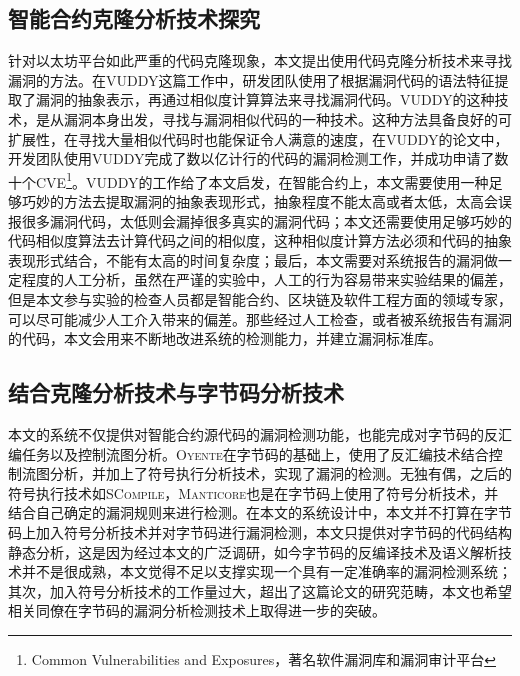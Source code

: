 \subsection{智能合约克隆分析技术探究}
针对以太坊平台如此严重的代码克隆现象，本文提出使用代码克隆分析技术来寻找漏洞的方法。在VUDDY\cite{vuddy}这篇工作中，研发团队使用了根据漏洞代码的语法特征提取了漏洞的抽象表示，再通过相似度计算算法来寻找漏洞代码。VUDDY的这种技术，是从漏洞本身出发，寻找与漏洞相似代码的一种技术。这种方法具备良好的可扩展性，在寻找大量相似代码时也能保证令人满意的速度，在VUDDY的论文中，开发团队使用VUDDY完成了数以亿计行的代码的漏洞检测工作，并成功申请了数十个CVE\footnote{Common Vulnerabilities and Exposures，著名软件漏洞库和漏洞审计平台}。VUDDY的工作给了本文启发，在智能合约上，本文需要使用一种足够巧妙的方法去提取漏洞的抽象表现形式，抽象程度不能太高或者太低，太高会误报很多漏洞代码，太低则会漏掉很多真实的漏洞代码；本文还需要使用足够巧妙的代码相似度算法去计算代码之间的相似度，这种相似度计算方法必须和代码的抽象表现形式结合，不能有太高的时间复杂度；最后，本文需要对系统报告的漏洞做一定程度的人工分析，虽然在严谨的实验中，人工的行为容易带来实验结果的偏差，但是本文参与实验的检查人员都是智能合约、区块链及软件工程方面的领域专家，可以尽可能减少人工介入带来的偏差。那些经过人工检查，或者被系统报告有漏洞的代码，本文会用来不断地改进系统的检测能力，并建立漏洞标准库。

\subsection{结合克隆分析技术与字节码分析技术}
本文的系统不仅提供对智能合约源代码的漏洞检测功能，也能完成对字节码的反汇编任务以及控制流图分析。\textsc{Oyente}\cite{oyente}在字节码的基础上，使用了反汇编技术结合控制流图分析，并加上了符号执行分析技术，实现了漏洞的检测。无独有偶，之后的符号执行技术如\textsc{SCompile}\cite{scompile}，\textsc{Manticore}\cite{manticore}也是在字节码上使用了符号分析技术，并结合自己确定的漏洞规则来进行检测。在本文的系统设计中，本文并不打算在字节码上加入符号分析技术并对字节码进行漏洞检测，本文只提供对字节码的代码结构静态分析，这是因为经过本文的广泛调研，如今字节码的反编译技术及语义解析技术并不是很成熟，本文觉得不足以支撑实现一个具有一定准确率的漏洞检测系统；其次，加入符号分析技术的工作量过大，超出了这篇论文的研究范畴，本文也希望相关同僚在字节码的漏洞分析检测技术上取得进一步的突破。

